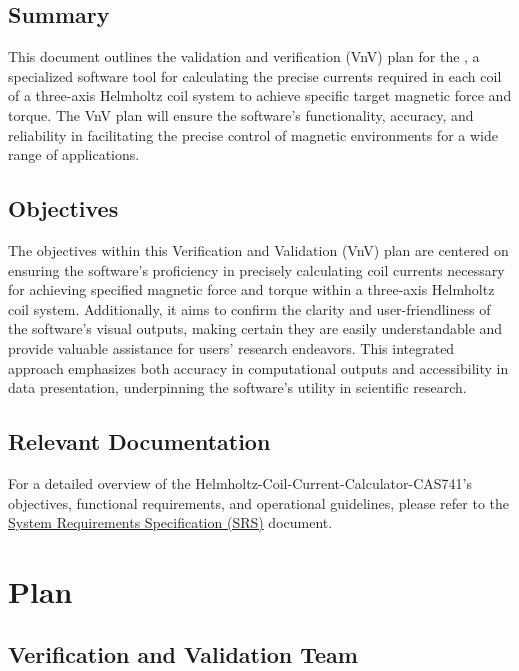 \documentclass[12pt, titlepage]{article}
\begin{document}
\subsection{Summary}

This document outlines the validation and verification (VnV) plan for the \progname{}, a specialized software tool for calculating the precise currents required in each coil of a three-axis Helmholtz coil system to achieve specific target magnetic force and torque. The VnV plan will ensure the software's functionality, accuracy, and reliability in facilitating the precise control of magnetic environments for a wide range of applications.
\subsection{Objectives}

The objectives within this Verification and Validation (VnV) plan are centered on ensuring the software's proficiency in precisely calculating coil currents necessary for achieving specified magnetic force and torque within a three-axis Helmholtz coil system. Additionally, it aims to confirm the clarity and user-friendliness of the software’s visual outputs, making certain they are easily understandable and provide valuable assistance for users’ research endeavors. This integrated approach emphasizes both accuracy in computational outputs and accessibility in data presentation, underpinning the software's utility in scientific research.

\subsection{Relevant Documentation}

For a detailed overview of the Helmholtz-Coil-Current-Calculator-CAS741's objectives, functional requirements, and operational guidelines, please refer to the  \href{https://github.com/rnorouziani/Helmholtz-Coil-Current-Calculator-CAS741/blob/main/docs/SRS/SRS.pdf}{System Requirements Specification (SRS)} document.

\section{Plan}

\subsection{Verification and Validation Team}
\end{document}
